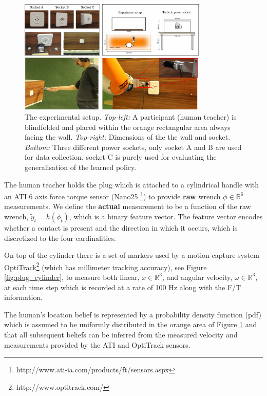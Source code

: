 \documentclass[final,3p,times,twocolumn]{elsarticle}
\begin{document}
\begin{figure}
 \centering
 \includegraphics[width=0.8\textwidth]{./Figure/Figure1.pdf}
 \caption{The experimental setup. \textit{Top-left:} A participant (human teacher) is blindfolded and 
    placed within the orange rectangular area always facing the wall. \textit{Top-right:} Dimensions of the 
    the wall and socket. \textit{Bottom:} Three different power sockets, only socket A and B are used for data collection, socket
    C is purely used for evaluating the generalisation of the learned policy.}
    \label{fig:search_task_setup}
\end{figure}

The human teacher holds the plug which is attached to a cylindrical handle with 
an ATI 6 axis force torque sensor (Nano25 \footnote{http://www.ati-ia.com/products/ft/sensors.aspx}) 
to provide \textbf{raw} wrench $\phi \in \mathbb{R}^6$ measurements. We define the \textbf{actual} measurement 
to be a function of the raw wrench, $\tilde{y}_t = h(\phi_t)$, which is a binary feature vector. The feature vector encodes whether a contact is present 
and the direction in which it occurs, which is discretized to the four cardinalities.

On top of the cylinder there is a set of markers used by a motion capture system 
OptiTrack\footnote{http://www.optitrack.com/} (which has millimeter tracking accuracy), 
see Figure \ref{fig:plug_cylinder}, to measure both linear, $\dot{x} \in \mathbb{R}^3$, 
and angular velocity, $\omega \in \mathbb{R}^3$, at each time step which is recorded at 
a rate of 100 Hz along with the F/T information.


The human's location belief is represented by a probability density function (pdf) which 
is assumed to be uniformly distributed in the orange area of Figure \ref{fig:search_task_setup}
and that all subsequent beliefs can be inferred from the measured velocity and measurements 
provided by the ATI and OptiTrack sensors.
\end{document}

